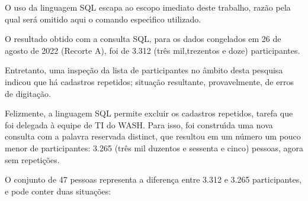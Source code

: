 \documentclass[
12pt,		%
openright,	%
twoside,  %
a4paper,			%
chapter=TITLE,		%
english,			%
french,				%
spanish,			%
brazil				%
]{USPSC-classe/USPSC}
\begin{document}
O uso da linguagem SQL escapa ao escopo imediato deste trabalho, raz\~ao pela qual ser\'a omitido aqui o comando espec\'{\i}fico utilizado.

















O resultado obtido com a consulta SQL, para os dados congelados em 26 de agosto de 2022 (Recorte A), foi de 3.312 (tr\^es mil,trezentos e doze) participantes.

















Entretanto, uma inspe\c{c}\~ao da lista de participantes no \^ambito desta pesquisa indicou que h\'a cadastros repetidos; situa\c{c}\~ao resultante, provavelmente, de erros de digita\c{c}\~ao.

















Felizmente, a linguagem SQL permite excluir os cadastros repetidos, tarefa que foi delegada \`a equipe de TI do WASH. Para isso, foi constru\'{\i}da uma nova consulta com a palavra reservada \textquotedbl distinct\textquotedbl , que resultou em um n\'umero um pouco menor de participantes: 3.265 (tr\^es mil duzentos e sessenta e cinco) pessoas, agora sem repeti\c{c}\~oes.

















O conjunto de 47 pessoas representa a diferen\c{c}a entre 3.312 e 3.265 participantes, e pode conter duas situa\c{c}\~oes:
\end{document}
